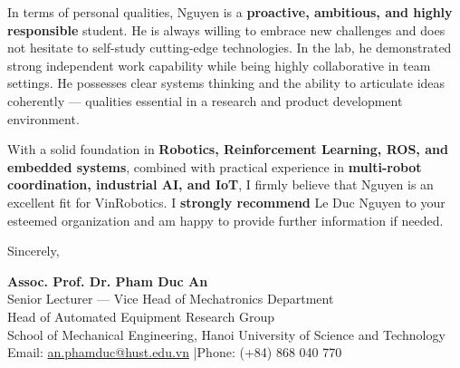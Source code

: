 \documentclass[11pt,a4paper]{article}
\begin{document}
In terms of personal qualities, Nguyen is a \textbf{proactive, ambitious, and highly responsible} student. He is always willing to embrace new challenges and does not hesitate to self-study cutting-edge technologies. In the lab, he demonstrated strong independent work capability while being highly collaborative in team settings. He possesses clear systems thinking and the ability to articulate ideas coherently --- qualities essential in a research and product development environment.

With a solid foundation in \textbf{Robotics, Reinforcement Learning, ROS, and embedded systems}, combined with practical experience in \textbf{multi-robot coordination, industrial AI, and IoT}, I firmly believe that Nguyen is an excellent fit for VinRobotics. I \textbf{strongly recommend} Le Duc Nguyen to your esteemed organization and am happy to provide further information if needed.

\vspace{1em}

Sincerely,

\vspace{1.5em}

\textbf{Assoc. Prof. Dr. Pham Duc An}\\
Senior Lecturer --- Vice Head of Mechatronics Department\\
Head of Automated Equipment Research Group\\
School of Mechanical Engineering, Hanoi University of Science and Technology\\
Email: \href{mailto:an.phamduc@hust.edu.vn}{an.phamduc@hust.edu.vn} \quad|\quad Phone: (+84) 868 040 770
\end{document}

